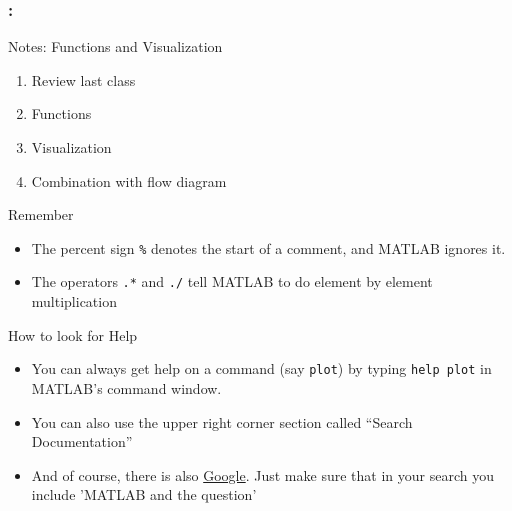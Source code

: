 \documentclass[11pt]{beamer}
\begin{document}
\begin{frame}[fragile]
	\frametitle{\secname : \subsecname}
	
	\begin{block}{}
		\centering
		Notes: Functions and Visualization \\
	\end{block}
	\begin{minipage}[t]{0.43\linewidth}
	\vspace{-10pt}
		\begin{enumerate}
			\item Review last class 
			\item Functions 
			\item Visualization
			\item Combination with flow diagram
		\end{enumerate}
		\vspace{-10pt}
		\begin{alertblock}{Remember}
			\begin{itemize}
			\item The percent sign \verb|%| denotes
			the start of a comment, and MATLAB ignores it.\\
			\item The operators \verb|.*| and \verb|./| tell MATLAB to do element by element multiplication
			\end{itemize}
		\end{alertblock}
	\end{minipage}
	\hspace{10pt}
	\begin{minipage}[t]{0.51\linewidth}
		\vspace{-15pt}
		\begin{block}{How to look for Help}
			\begin{itemize}
				\item You can always get help on a command (say \verb|plot|) by typing \verb|help plot| in MATLAB's command window.
				\item You can also use the upper right corner section called ``Search Documentation''
				\item And of course, there is also \href{www.google.com}{Google}. Just make sure that in your search you include 'MATLAB and the question'
			\end{itemize}			
		\end{block}
	\end{minipage}
\end{frame}
\end{document}
